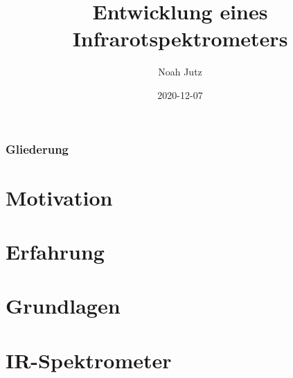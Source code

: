 \documentclass{beamer}
\title{Entwicklung eines Infrarotspektrometers}
\author{Noah Jutz}
\institute{Privat-Gymnasium PINDL Regensburg}
\date{2020-12-07}
\begin{document}
\frame{\titlepage}

\begin{frame}
    \frametitle{Gliederung}
    \tableofcontents
\end{frame}

\section{Motivation}


\section{Erfahrung}


\section{Grundlagen}


\section{IR-Spektrometer}

\end{document}
